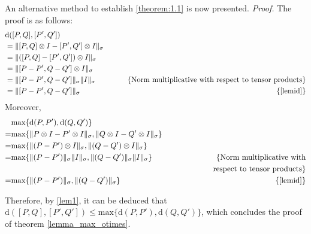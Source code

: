 An alternative method to establish \autoref{theorem:1.1} is now presented.
\vspace{5pt}
\textit {Proof.} The proof is as follows:
\begin{equation}
  \begin{split}
    & \text{d} ([P,Q],[P',Q'])  \\
    &=   \lVert  [P,Q] \otimes I - [P',Q'] \otimes I    \rVert_{\sigma} \hspace{2pt} \\
    &=   \lVert  ([P,Q]  - [P',Q']) \otimes I    \rVert_{\sigma} \hspace{2pt} \\
    &=   \lVert  [P-P',Q-Q'] \otimes I  \rVert_{\sigma}   \\
    &=    \lVert  [P-P',Q-Q'] \rVert_{\sigma} \lVert I \rVert_{\sigma}\hspace{2pt} & \hspace {20pt} \text{\{Norm multiplicative with respect to tensor products\}} \\ 
    &=    \lVert  [P-P',Q-Q'] \rVert_{\sigma} & \text{\{\autoref{lemid}\}}  \\
  \end{split}
  \end{equation}
Moreover,
\begin{equation}
  \begin{split}
     &  \text{max} \{\text{d} (P,P'),\text{d} (Q,Q')\} \\
     = &  \text{max}\{ \lVert P \otimes I - P' \otimes I \rVert_{\sigma}, \lVert Q \otimes I - Q'\otimes I \rVert_{\sigma} \}\\
     = &  \text{max}\{ \lVert (P - P') \otimes I \rVert_{\sigma}, \lVert (Q - Q') \otimes I \rVert_{\sigma} \}\\
     = &\text{max}\{ \lVert (P - P') \rVert_{\sigma} \lVert  I \rVert_{\sigma}, \lVert (Q - Q') \rVert_{\sigma} \lVert I \rVert_{\sigma} \} & \hspace{60pt} \text{\{Norm multiplicative with}\\
     && \text{respect to tensor products\}} \\
     = & \text{max}\{ \lVert (P - P') \rVert_{\sigma}, \lVert (Q - Q') \rVert_{\sigma}  \}  & \text{\{\autoref{lemid}\}}  \\
    \end{split}
  \end{equation}

Therefore, by \autoref{lem1}, it can be deduced that $\text{d} ([P,Q],[P',Q']) \leq \text{max} \{\text{d} (P,P'),\text{d} (Q,Q')\}$, which concludes the proof of theorem \autoref{lemma_max_otimes}.

